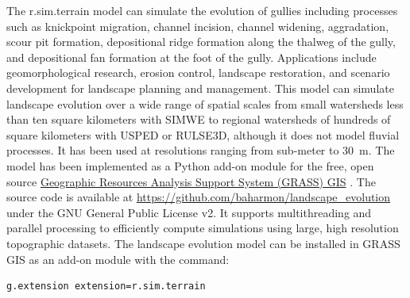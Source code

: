 \documentclass[gmd, manuscript]{copernicus}
\begin{document}
The r.sim.terrain model
can simulate the evolution of gullies
including processes such as 
knickpoint migration,
channel incision, 
channel widening, 
aggradation, 
scour pit formation,
depositional ridge formation
along the thalweg of the gully,
and depositional fan formation at the foot of the gully. 
Applications include 
geomorphological research,
erosion control, 
landscape restoration, 
and scenario development 
for landscape planning and management.
This model can simulate landscape evolution 
over a wide range of spatial scales 
from small watersheds 
less than ten square kilometers
with SIMWE
to regional watersheds
of hundreds of square kilometers
with USPED or RULSE3D,
although it does not model fluvial processes. 
It has been used at resolutions ranging from sub-meter to 30~\unit{m}.
The model has been implemented 
as a Python add-on module 
for the free, open source
\href{https://grass.osgeo.org/}{Geographic Resources Analysis Support System (GRASS) GIS}
\citep{GRASS}. 
The source code is available at 
\url{https://github.com/baharmon/landscape\_evolution} 
under the GNU General Public License v2.
It supports multithreading and parallel processing
to efficiently compute simulations 
using large, high resolution topographic datasets.
%
The landscape evolution model 
can be installed in GRASS GIS as an add-on module 
with the command: 
\begin{verbatim}
g.extension extension=r.sim.terrain
\end{verbatim}

\end{document}

